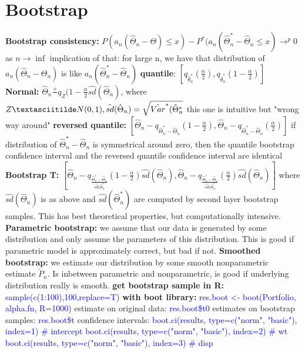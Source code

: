 \section{Bootstrap}
\textbf{Bootstrap consistency: }$P(a_n(\hat\Theta_n-\Theta) \leq x)-P^*(a_n(\hat\Theta_n^*-\hat\Theta_n \leq x) \rightarrow^p 0$ as $n \rightarrow \inf$ implication of that: for large n, we have that distribution of $a_n(\hat\Theta_n - \Theta_n)$ is like $a_n(\hat\Theta^*_n- \hat\Theta_n)$
\textbf{quantile}: $[q_{\hat\theta_n^*}(\frac{\alpha}{2}),q_{\hat\theta_n^*}(1-\frac{\alpha}{2})]$
\textbf{Normal: }$\hat\Theta_n \frac{+}{} q_Z(1-\frac{\alpha}{2}\hat{sd}(\hat\Theta_n)$, where $Z \textasciitilde N(0,1), \hat{sd}(\hat \Theta_n) = \sqrt{\hat{Var}^*(\hat{\Theta}_n^*}$ this one is intuitive but "wrong way around"
\textbf{reversed quantile: } $[\hat\Theta_n - q_{\hat\Theta_n^*-\hat\Theta_n}(1-\frac{\alpha}{2}), \hat\Theta_n - q_{\hat\Theta_n^*-\hat\Theta_n}(\frac{\alpha}{2})]$  if distribution of $\hat \Theta_n^*- \hat \Theta_n$ is symmetrical around zero, then the quantile bootstrap confidence interval and the reversed quantile confidence interval are identical 
\textbf{Bootstrap T: }$[\hat\Theta_n - q_{\frac{\hat\Theta_n^*-\hat\Theta_n}{\hat{sd}(\hat\Theta_n^*}}(1-\frac{\alpha}{2})\hat{sd}(\hat\Theta_n), \hat\Theta_n - q_{\frac{\hat\Theta_n^*-\hat\Theta_n}{\hat{sd}(\hat\Theta_n^*}}(\frac{\alpha}{2})\hat{sd}(\hat\Theta_n)]$ where $\hat{sd}(\hat\Theta_n)$ is as above and $\hat{sd}(\hat\Theta_n^*)$ are computed by second layer bootstrap samples. This has best theoretical properties, but computationally intensive. 
\textbf{Parametric bootstrap: } we assume that our data is generated by some distribution and only assume the parameters of this distribution. This is good if parametric model is approximately correct, but bad if not. 
\textbf{Smoothed bootstrap: } we estimate our distribution by some smooth nonparametric estimate $\tilde P_n$. Is inbetween parametric and nonparametric, is good if underlying distribution really is smooth. 
\textbf{get bootstrap sample in R: } \textcolor{blue}{sample(c(1:100),100,replace=T)} \textbf{with boot library: } \textcolor{blue}{res.boot <- boot(Portfolio, alpha.fn, R=1000)} estimate on original data: \textcolor{blue}{res.boot\$t0 } estimates on bootstrap samples: \textcolor{blue}{res.boot\$t} confidence intervals: \textcolor{blue}{boot.ci(results, type=c("norm", "basic"), index=1) \# intercept 
boot.ci(results, type=c("norm", "basic"), index=2) \# wt 
boot.ci(results, type=c("norm", "basic"), index=3) \# disp
}